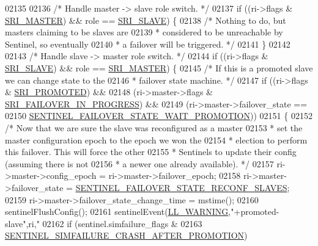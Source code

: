 \begin{DoxyCode}
{{{{{{{{{{{{{{{{{{{{{{{{{{{{{{{{{{{{{{{{{{02135 
02136     \textcolor{comment}{/* Handle master -> slave role switch. */}
02137     \textcolor{keywordflow}{if} ((ri->flags & \hyperlink{sentinel_8c_a2ee83e5ff67b45746cd6a310f15334b2}{SRI\_MASTER}) && role == \hyperlink{sentinel_8c_a4b9db21eda79d49bd9fdf2cf7b3178e8}{SRI\_SLAVE}) \{
02138         \textcolor{comment}{/* Nothing to do, but masters claiming to be slaves are}
02139 \textcolor{comment}{         * considered to be unreachable by Sentinel, so eventually}
02140 \textcolor{comment}{         * a failover will be triggered. */}
02141     \}
02142 
02143     \textcolor{comment}{/* Handle slave -> master role switch. */}
02144     \textcolor{keywordflow}{if} ((ri->flags & \hyperlink{sentinel_8c_a4b9db21eda79d49bd9fdf2cf7b3178e8}{SRI\_SLAVE}) && role == \hyperlink{sentinel_8c_a2ee83e5ff67b45746cd6a310f15334b2}{SRI\_MASTER}) \{
02145         \textcolor{comment}{/* If this is a promoted slave we can change state to the}
02146 \textcolor{comment}{         * failover state machine. */}
02147         \textcolor{keywordflow}{if} ((ri->flags & \hyperlink{sentinel_8c_a6c6c019b1af48a9c0e9507422051c684}{SRI\_PROMOTED}) &&
02148             (ri->master->flags & \hyperlink{sentinel_8c_a0546b63633196f09fcd90957243b0798}{SRI\_FAILOVER\_IN\_PROGRESS}) &&
02149             (ri->master->failover\_state ==
02150                 \hyperlink{sentinel_8c_a49d9c64c03e76dcbf7728ad64dd99330}{SENTINEL\_FAILOVER\_STATE\_WAIT\_PROMOTION}))
02151         \{
02152             \textcolor{comment}{/* Now that we are sure the slave was reconfigured as a master}
02153 \textcolor{comment}{             * set the master configuration epoch to the epoch we won the}
02154 \textcolor{comment}{             * election to perform this failover. This will force the other}
02155 \textcolor{comment}{             * Sentinels to update their config (assuming there is not}
02156 \textcolor{comment}{             * a newer one already available). */}
02157             ri->master->config\_epoch = ri->master->failover\_epoch;
02158             ri->master->failover\_state = 
      \hyperlink{sentinel_8c_a05b020edfa71eb4d24288e79637b57f5}{SENTINEL\_FAILOVER\_STATE\_RECONF\_SLAVES};
02159             ri->master->failover\_state\_change\_time = mstime();
02160             sentinelFlushConfig();
02161             sentinelEvent(\hyperlink{server_8h_a31229b9334bba7d6be2a72970967a14b}{LL\_WARNING},\textcolor{stringliteral}{"+promoted-slave"},ri,\textcolor{stringliteral}{"%
02162             \textcolor{keywordflow}{if} (sentinel.simfailure\_flags &
02163                 \hyperlink{sentinel_8c_a87a09f4dcf854cc0b26dc8dc328ab7c3}{SENTINEL\_SIMFAILURE\_CRASH\_AFTER\_PROMOTION})
}}}}}}}}}}}}}}}}}}}}}}}}}}}}}}}}}}}}}}}}}}}
\end{DoxyCode}
